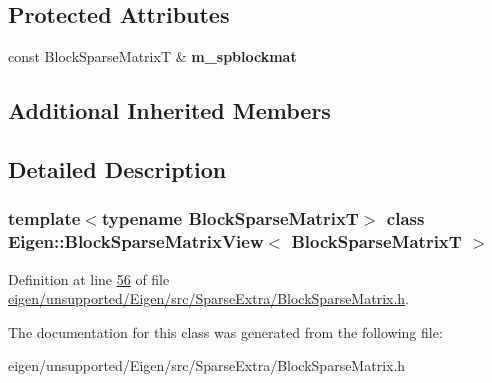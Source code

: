 \subsection*{Protected Attributes}
\begin{DoxyCompactItemize}
\item 
\mbox{\label{class_eigen_1_1_block_sparse_matrix_view_a1e515a711e7107ccc2a9088e8b54f69f}} 
const Block\+Sparse\+MatrixT \& {\bfseries m\+\_\+spblockmat}
\end{DoxyCompactItemize}
\subsection*{Additional Inherited Members}


\subsection{Detailed Description}
\subsubsection*{template$<$typename Block\+Sparse\+MatrixT$>$\newline
class Eigen\+::\+Block\+Sparse\+Matrix\+View$<$ Block\+Sparse\+Matrix\+T $>$}



Definition at line \hyperlink{eigen_2unsupported_2_eigen_2src_2_sparse_extra_2_block_sparse_matrix_8h_source_l00056}{56} of file \hyperlink{eigen_2unsupported_2_eigen_2src_2_sparse_extra_2_block_sparse_matrix_8h_source}{eigen/unsupported/\+Eigen/src/\+Sparse\+Extra/\+Block\+Sparse\+Matrix.\+h}.



The documentation for this class was generated from the following file\+:\begin{DoxyCompactItemize}
\item 
eigen/unsupported/\+Eigen/src/\+Sparse\+Extra/\+Block\+Sparse\+Matrix.\+h\end{DoxyCompactItemize}
